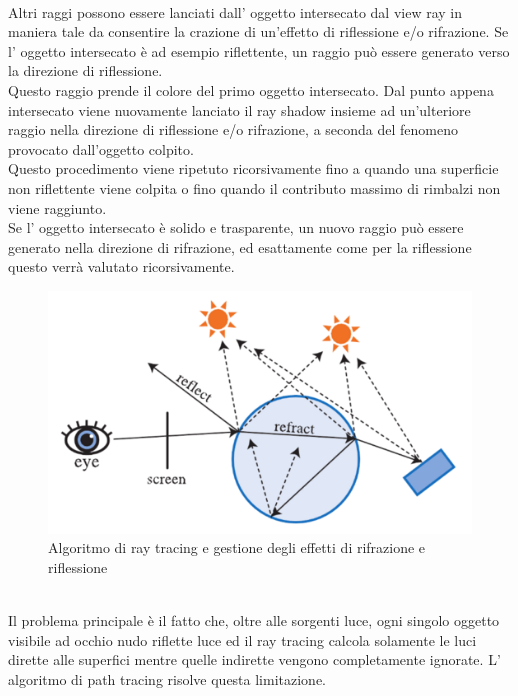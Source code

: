 \\
Altri raggi possono essere lanciati dall’ oggetto intersecato dal view ray in maniera tale da consentire la crazione di un’effetto di riflessione e/o rifrazione.
Se l’ oggetto intersecato è ad esempio riflettente, un raggio può essere generato verso la direzione di riflessione.
\\
Questo raggio prende il colore del primo oggetto intersecato. Dal punto appena intersecato viene nuovamente lanciato il ray shadow insieme ad un’ulteriore raggio nella direzione di riflessione e/o rifrazione, a seconda del fenomeno provocato dall’oggetto colpito. 
\\Questo procedimento viene ripetuto ricorsivamente fino a quando una superficie non riflettente viene colpita o fino quando il contributo massimo di rimbalzi non viene raggiunto.
\\
Se l’ oggetto intersecato è solido e trasparente, un nuovo raggio può essere generato nella direzione di rifrazione, ed esattamente come per la riflessione questo verrà valutato ricorsivamente.
\\
\begin{figure}[htb]
 \centering
 \includegraphics[width=0.7\linewidth]{images/chapter_stato_arte/stato_arte_refr_refl.png}\hfill
 \caption[Ray tracing ed effetti di rifrazione/riflessione]{Algoritmo di ray tracing e gestione degli effetti di rifrazione e riflessione}
 \label{fig:stato_arte_refr_refl}
\end{figure}
\\
Il problema principale è il fatto che, oltre alle sorgenti luce, ogni singolo oggetto visibile ad occhio nudo riflette luce ed il 
ray tracing calcola solamente le luci dirette alle superfici mentre quelle indirette vengono completamente ignorate. L’ algoritmo di path tracing risolve questa limitazione.